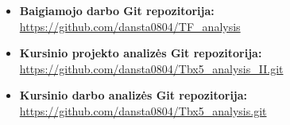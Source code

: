 \documentclass[12pt]{article}
\begin{document}
\begin{itemize}
    \item \textbf{Baigiamojo darbo Git repozitorija:}\\
        \url{https://github.com/dansta0804/TF\_analysis}
    \item \textbf{Kursinio projekto analizės Git repozitorija:}\\
        \url{https://github.com/dansta0804/Tbx5\_analysis\_II.git}
    \item \textbf{Kursinio darbo analizės Git repozitorija:}\\
        \url{https://github.com/dansta0804/Tbx5\_analysis.git}
\end{itemize}
\end{document}
